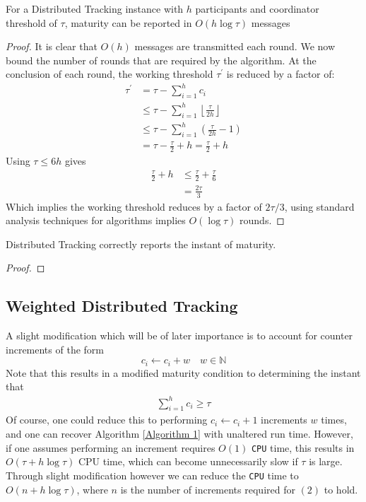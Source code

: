 \begin{theorem} For a Distributed Tracking instance with $h$ participants and coordinator threshold of $\tau$, maturity can be reported in $O(h\log\tau)$ messages
\end{theorem}
\begin{proof}
    It is clear that $O(h)$ messages are transmitted each round. We now bound the number of rounds that are required by the algorithm. At the conclusion of each round, the working threshold $\tau^\prime$ is reduced by a factor of: 
    \begin{align*}
        \tau^\prime &= \tau - \sum_{i=1}^{h}c_i \\
        &\leq \tau - \sum_{i=1}^{h}\left\lfloor \frac{\tau}{2h}\right\rfloor \\
        &\leq \tau - \sum_{i=1}^{h} \left(\frac{\tau}{2h} - 1\right) \\
        &= \tau - \frac{\tau}{2} + h = \frac{\tau}{2} + h
    \end{align*}
    Using $\tau \leq 6h$ gives
    \begin{align*}
        \frac{\tau}{2} +h &\leq \frac{\tau}{2} + \frac{\tau}{6} \\
        &= \frac{2\tau}{3}
    \end{align*}
    Which implies the working threshold reduces by a factor of $2\tau/3$, using standard analysis techniques for algorithms implies $O(\log \tau)$ rounds. 
\end{proof}


\begin{theorem} Distributed Tracking correctly reports the instant of maturity.
\end{theorem}
\begin{proof}
    
\end{proof}


\subsection{Weighted Distributed Tracking}

A slight modification which will be of later importance is to account for counter increments of the form
$$c_i \leftarrow c_i + w \quad w \in \mathbb{N}$$
Note that this results in a modified maturity condition to determining the instant that 
\begin{align}
    \sum_{i=1}^{h}c_i \geq \tau
\end{align}
Of course, one could reduce this to performing $c_i \leftarrow c_i +1$ increments $w$ times, and one can recover Algorithm \ref{Algorithm 1} with unaltered run time. However, if one assumes performing an increment requires $O(1)$ \texttt{CPU} time, this results in $O(\tau + h\log\tau)$ CPU time, which can become unnecessarily slow if $\tau$ is large.
Through slight modification however we can reduce the \texttt{CPU} time to $O(n+h\log\tau)$, where $n$ is the number of increments required for $(2)$ to hold.

